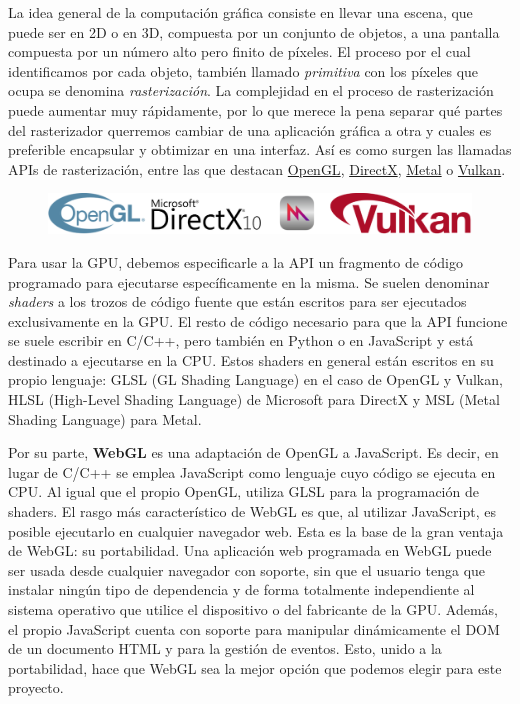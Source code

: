 La idea general de la computación gráfica consiste en llevar una escena, que puede ser en 2D o en 3D, compuesta por un conjunto de objetos, a una pantalla compuesta por un número alto pero finito de píxeles. El proceso por el cual identificamos por cada objeto, también llamado \textit{primitiva} con los píxeles que ocupa se denomina \textit{rasterización}. La complejidad en el proceso de rasterización puede aumentar muy rápidamente, por lo que merece la pena separar qué partes del rasterizador querremos cambiar de una aplicación gráfica a otra y cuales es preferible encapsular y obtimizar en una interfaz. Así es como surgen las llamadas APIs de rasterización, entre las que destacan \textcolor{blue}{\href{https://www.opengl.org/}{OpenGL}}, \textcolor{blue}{\href{https://www.microsoft.com/es-es/download/details.aspx?id=35}{DirectX}}, \textcolor{blue}{\href{https://developer.apple.com/metal/}{Metal}} o \textcolor{blue}{\href{https://www.vulkan.org/}{Vulkan}}.

\begin{figure} [ht]
    \centering
    \includegraphics[scale = 0.3]{img/C5/APis.png}
\end{figure}

Para usar la GPU, debemos especificarle a la API un fragmento de código programado para ejecutarse específicamente en la misma. Se suelen denominar \textit{shaders} a los trozos de código fuente que están escritos para ser ejecutados exclusivamente en la GPU. El resto de código necesario para que la API funcione se suele escribir en C/C++, pero también en Python o en JavaScript y está destinado a ejecutarse en la CPU. Estos shaders en general están escritos en su propio lenguaje: GLSL (GL Shading Language) en el caso de OpenGL y Vulkan, HLSL (High-Level Shading Language) de Microsoft para DirectX y MSL (Metal Shading Language) para Metal. 

Por su parte, \textbf{WebGL} es una adaptación de OpenGL a JavaScript. Es decir, en lugar de C/C++ se emplea JavaScript como lenguaje cuyo código se ejecuta en CPU. Al igual que el propio OpenGL, utiliza GLSL para la programación de shaders. El rasgo más característico de WebGL es que, al utilizar JavaScript, es posible ejecutarlo en cualquier navegador web. Esta es la base de la gran ventaja de WebGL: su portabilidad. Una aplicación web programada en WebGL puede ser usada desde cualquier navegador con soporte, sin que el usuario tenga que instalar ningún tipo de dependencia y de forma totalmente independiente al sistema operativo que utilice el dispositivo o del fabricante de la GPU. Además, el propio JavaScript cuenta con soporte para manipular dinámicamente el DOM de un documento HTML y para la gestión de eventos. Esto, unido a la portabilidad, hace que WebGL sea la mejor opción que podemos elegir para este proyecto.

